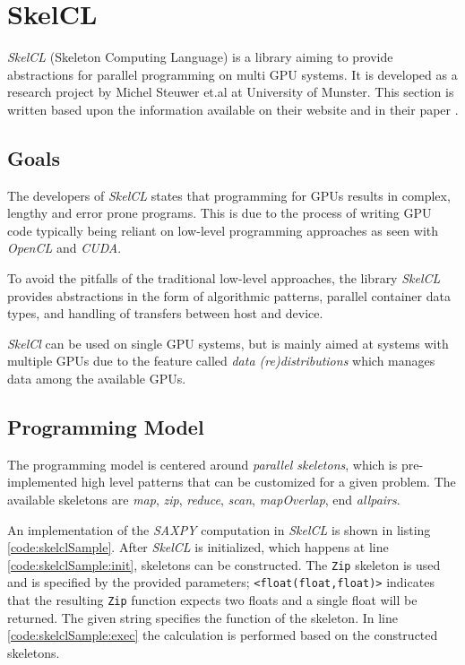\section{SkelCL}\label{cha:skelclRelatedWorks}
\textit{SkelCL} (Skeleton Computing Language) is a library aiming to provide abstractions for parallel programming on multi GPU systems. It is developed as a research project by Michel Steuwer et.al at University of Munster. This section is written based upon the information available on their website \cite{skelclWebsite} and in their paper \cite{skelclPaper}.

\subsection{Goals}
The developers of \textit{SkelCL} states that programming for GPUs results in complex, lengthy and error prone programs. This is due to the process of writing GPU code typically being reliant on low-level programming approaches as seen with \textit{OpenCL} and \textit{CUDA}. 

To avoid the pitfalls of the traditional low-level approaches, the library \textit{SkelCL} provides abstractions in the form of algorithmic patterns, parallel container data types, and handling of transfers between host and device. 

\textit{SkelCl} can be used on single GPU systems, but is mainly aimed at systems with multiple GPUs due to the feature called \textit{data (re)distributions} which manages data among the available GPUs.

\subsection{Programming Model}
The programming model is centered around \textit{parallel skeletons}, which is pre-implemented high level patterns that can be customized for a given problem. The available skeletons are \textit{map}, \textit{zip}, \textit{reduce}, \textit{scan}, \textit{mapOverlap}, end \textit{allpairs}.

An implementation of the \textit{SAXPY} computation in \textit{SkelCL} is shown in listing \ref{code:skelclSample}. After \textit{SkelCL} is initialized, which happens at line \ref{code:skelclSample:init}, skeletons can be constructed. The \texttt{Zip} skeleton is used and is specified by the provided parameters; \texttt{<float(float,float)>} indicates that the resulting \texttt{Zip} function expects two floats and a single float will be returned. The given string specifies the function of the skeleton. In line \ref{code:skelclSample:exec} the calculation is performed based on the constructed skeletons.

